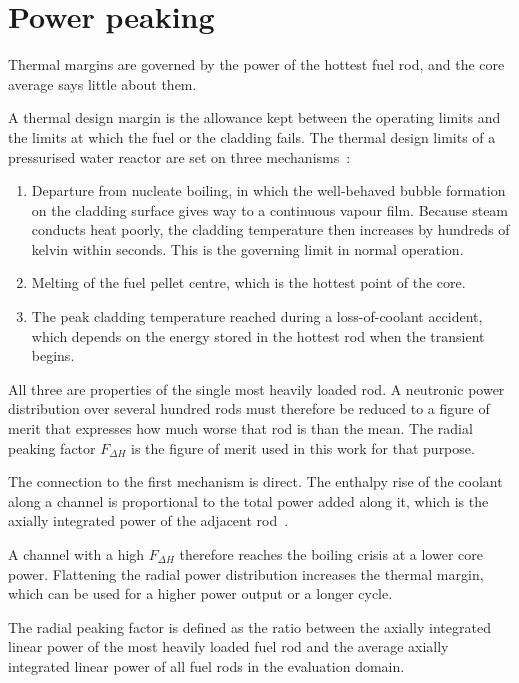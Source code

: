 \section{Power peaking}
\label{sec:bg-peaking}

Thermal margins are governed by the power of the hottest fuel rod, and
the core average says little about them.

A thermal design margin is the allowance kept between the operating
limits and the limits at which the fuel or the cladding fails. The
thermal design limits of a pressurised water reactor are set on three
mechanisms~\cite{todreas_kazimi_2012}:

\begin{enumerate}
  \item Departure from nucleate boiling, in which the well-behaved
        bubble formation on the cladding surface gives way to a
        continuous vapour film. Because steam conducts heat poorly, the
        cladding temperature then increases by hundreds of kelvin within
        seconds. This is the governing limit in normal operation.

  \item Melting of the fuel pellet centre, which is the hottest point
        of the core.

  \item The peak cladding temperature reached during a loss-of-coolant
        accident, which depends on the energy stored in the hottest rod
        when the transient begins.
\end{enumerate}

All three are properties of the single most heavily loaded rod. A
neutronic power distribution over several hundred rods must therefore be
reduced to a figure of merit that expresses how much worse that rod is
than the mean. The radial peaking factor $F_{\Delta H}$ is the figure of
merit used in this work for that purpose.

The connection to the first mechanism is direct. The enthalpy rise of
the coolant along a channel is proportional to the total power added
along it, which is the axially integrated power of the adjacent
rod~\cite{todreas_kazimi_2012}.

A channel with a high $F_{\Delta H}$ therefore reaches the boiling
crisis at a lower core power. Flattening the radial power distribution
increases the thermal margin, which can be used for a higher power
output or a longer cycle.

The radial peaking factor is defined as the ratio between the axially
integrated linear power of the most heavily loaded fuel rod and the
average axially integrated linear power of all fuel rods in the
evaluation domain.

